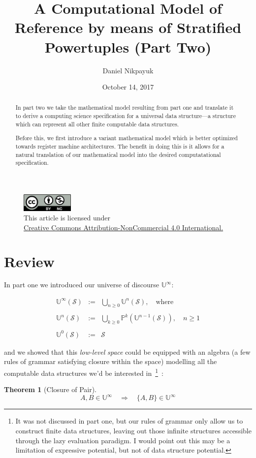 \documentclass[twoside]{article}
\title{A Computational Model of Reference by means of Stratified Powertuples (Part Two)}
\author{Daniel Nikpayuk}
\date{October 14, 2017}
\newcommand{\nthus}[2][U]{\ensuremath{\mathbb{#1}^{#2}}}
\newcommand{\psunion}[2][P]{\ensuremath{\bigcup_{#2\ge 0}\mathbb{#1}^{#2}}}
\newcommand{\usunion}[2][U]{\ensuremath{\bigcup_{#2\ge 0}\mathbb{#1}^{#2}}}
\newcommand{\stratified}{\ensuremath{\mathbb{U}^\infty}}
\newcommand{\of}[1]{\ensuremath{(\mathcal{#1})}}
\newcommand{\then}{\ensuremath{\quad\Longrightarrow\quad}}
\newtheorem{theorem}{Theorem}
\newenvironment{definition}[1][Definition]{\begin{trivlist}
\item[\hskip \labelsep {\bfseries #1:}]}{\end{trivlist}}
\begin{document}
\maketitle
\thispagestyle{empty}

\begin{figure}[h]
\centering
\includegraphics[width=1in]{../../../cc-by-nc.png}\\[0.1in]
\tiny This article is licensed under \\
\href{http://creativecommons.org/licenses/by-nc/4.0/}
{Creative Commons Attribution-NonCommercial 4.0 International.}\\[0.3in]
\end{figure}

\begin{abstract}
In part two we take the mathematical model resulting from part one and translate it to derive a computing science
specification for a universal data structure---a structure which can represent all other finite computable data structures.

Before this, we first introduce a variant mathematical model which is better optimized towards register machine architectures.
The benefit in doing this is it allows for a natural translation of our mathematical model into the desired computatational
specification.
\end{abstract}

\section*{Review}

In part one we introduced our universe of discourse $ \stratified $:
\begin{definition}[Stratified Powerset]
$$ \begin{array}{rcl}
\stratified\of{S}	& :=	& \usunion{n}\of{S},\quad\mbox{where}		\\
										\\
\nthus{n}\of{S}		& :=	& \psunion{k}(\nthus{n-1}\of{S}),\quad n\ge 1	\\
										\\
\nthus{0}\of{S}		& :=	& \mathcal{S}
\end{array} $$
\end{definition}
and we showed that this \emph{low-level} \emph{space} could be equipped with an algebra
(a few rules of grammar satisfying closure within the space) modelling all the computable data structures we'd be interested
in\ \footnote{It was not discussed in part one, but our rules of grammar only allow us to construct finite data structures,
leaving out those infinite structures accessible through the lazy evaluation paradigm. I would point out this may be
a limitation of expressive potential, but not of data structure potential.}\ :
\begin{theorem}[Closure of Pair]
$$ A,B\in\stratified\then\{A,B\}\in\stratified $$
\end{theorem}
\end{document}
